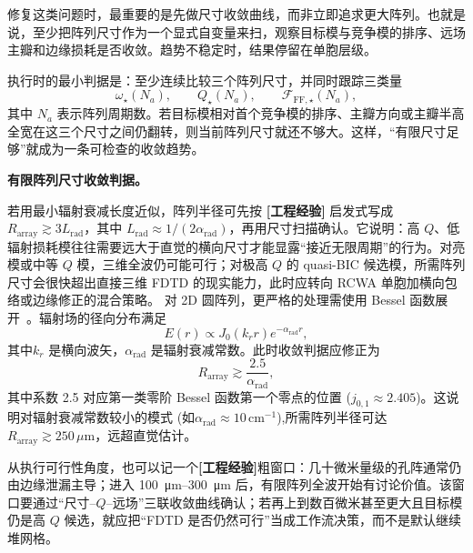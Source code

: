 修复这类问题时，最重要的是先做尺寸收敛曲线，而非立即追求更大阵列。也就是说，至少把阵列尺寸作为一个显式自变量来扫，观察目标模与竞争模的排序、远场主瓣和边缘损耗是否收敛。趋势不稳定时，结果停留在单胞层级。

执行时的最小判据是：至少连续比较三个阵列尺寸，并同时跟踪三类量
\begin{equation}
\omega_\star(N_a),\qquad
Q_\star(N_a),\qquad
\mathcal{F}_{\mathrm{FF},\star}(N_a),
\label{eq:array_size_convergence}
\end{equation}
其中 $N_a$ 表示阵列周期数。若目标模相对首个竞争模的排序、主瓣方向或主瓣半高全宽在这三个尺寸之间仍翻转，则当前阵列尺寸就还不够大。这样，“有限尺寸足够”就成为一条可检查的收敛趋势。

\begin{RigorousBox}
\textbf{有限阵列尺寸收敛判据。}

若用最小辐射衰减长度近似，阵列半径可先按 \textbf{[工程经验]} 启发式写成 $R_{\mathrm{array}}\gtrsim 3L_{\mathrm{rad}}$，其中 $L_{\mathrm{rad}}\approx 1/(2\alpha_{\mathrm{rad}})$，再用尺寸扫描确认\cite{wang2025finitesizepcsel}。它说明：高 $Q$、低辐射损耗模往往需要远大于直觉的横向尺寸才能显露“接近无限周期”的行为。对亮模或中等 $Q$ 模，三维全波仍可能可行；对极高 $Q$ 的 quasi-BIC 候选模，所需阵列尺寸会很快超出直接三维 FDTD 的现实能力，此时应转向 RCWA 单胞加横向包络或边缘修正的混合策略。
对 2D 圆阵列，更严格的处理需使用 Bessel 函数展开~\cite{kogelnik1979distributed}。辐射场的径向分布满足
\begin{equation}
E(r) \propto J_0(k_r r) e^{-\alpha_{\mathrm{rad}} r},
\end{equation}
其中$k_r$ 是横向波矢，$\alpha_{\mathrm{rad}}$ 是辐射衰减常数。此时收敛判据应修正为
\begin{equation}
R_{\mathrm{array}} \gtrsim \frac{2.5}{\alpha_{\mathrm{rad}}},
\label{eq:2d_array_convergence}
\end{equation}
其中系数 2.5 对应第一类零阶 Bessel 函数第一个零点的位置 ($j_{0,1}\approx 2.405$)。这说明对辐射衰减常数较小的模式 (如$\alpha_{\mathrm{rad}} \approx 10\,\mathrm{cm}^{-1}$),所需阵列半径可达$R_{\mathrm{array}} \gtrsim 250\,\mu\mathrm{m}$，远超直觉估计。\end{RigorousBox}

从执行可行性角度，也可以记一个\textbf{[工程经验]}粗窗口：几十微米量级的孔阵通常仍由边缘泄漏主导；进入 \SIrange{100}{300}{\micro\meter} 后，有限阵列全波开始有讨论价值。该窗口要通过“尺寸--$Q$--远场”三联收敛曲线确认\cite{wang2025finitesizepcsel,yoshida2023}；若再上到数百微米甚至更大且目标模仍是高 $Q$ 候选，就应把“FDTD 是否仍然可行”当成工作流决策，而不是默认继续堆网格。

